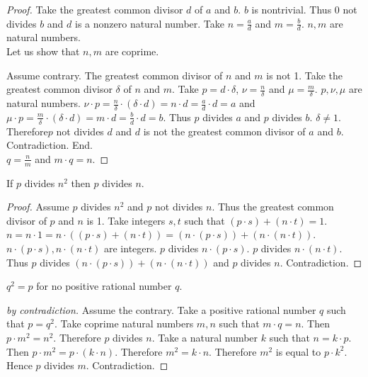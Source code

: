 \documentclass{article}
\begin{document}
\begin{forthel}
\begin{proof}
Take the greatest common divisor $d$ of $a$ and $b$. $b$ is nontrivial. Thus 0 not divides $b$ and $d$ is a nonzero natural number. 
Take $n = \frac{a}{d}$ and $m = \frac{b}{d}$. $n,m$ are natural numbers.\\

Let us show that $n,m$ are coprime. 

  Assume contrary. The greatest common divisor of $n$ and $m$ is not 1. Take the greatest common divisor $\delta$ of $n$ and $m$.
  Take $p = d \cdot \delta$, $\nu = \frac{n}{\delta}$ and $\mu = \frac{m}{\delta}$. $p,\nu,\mu$ are natural numbers.
  $\nu \cdot p = \frac{n}{\delta} \cdot (\delta \cdot d) = n \cdot d = \frac{a}{d} \cdot d = a$ and
  $\mu \cdot p = \frac{m}{\delta} \cdot (\delta \cdot d) = m \cdot d = \frac{b}{d} \cdot d = b$. 
  Thus $p$ divides $a$ and $p$ divides $b$. $\delta \neq 1$.
  Therefore$p$ not divides $d$ and $d$ is not the greatest common divisor of $a$ and $b$. Contradiction.
End.\\

$q = \frac{n}{m}$ and $m \cdot q = n$.
\end{proof}

    \begin{lemma}
      If $p$ divides $n^{2}$ then $p$ divides $n$. 
    \end{lemma}
    \begin{proof}
      Assume $p$ divides $n^{2}$ and $p$ not divides $n$. Thus the greatest common divisor of $p$ and $n$ is 1.
      Take integers $s,t$ such that $(p \cdot s) + (n \cdot t) = 1$.
      $n = n \cdot 1 = n \cdot ((p \cdot s) + (n \cdot t)) = (n \cdot (p \cdot s)) + (n \cdot (n \cdot t))$.
      $n \cdot (p \cdot s), n \cdot (n \cdot t)$ are integers.
      $p$ divides $n \cdot (p \cdot s)$. $p$ divides $n \cdot (n \cdot t)$.
      Thus $p$ divides $(n \cdot (p \cdot s)) + (n \cdot (n \cdot t))$ and $p$ divides $n$. Contradiction.
    \end{proof}


    \begin{theorem}[Pythagoras]
      $q^{2} = p$ for no positive rational number $q$.
    \end{theorem}
    \begin{proof}[by contradiction]
      Assume the contrary.
      Take a positive rational number $q$ such that $p = q^{2}$.
      Take coprime natural numbers $m,n$ such that $m \cdot q = n$.
      Then $p \cdot m^{2} = n^{2}$.
      Therefore $p$ divides $n$.
      Take a natural number $k$ such that $n = k \cdot p$.
      Then $p \cdot m^{2} = p \cdot (k \cdot n)$.
      Therefore $m^{2} = k \cdot n$.
      Therefore $m^{2}$ is equal to $p \cdot k^{2}$.
      Hence $p$ divides $m$.
      Contradiction.
    \end{proof}
  \end{forthel}
\end{document}
